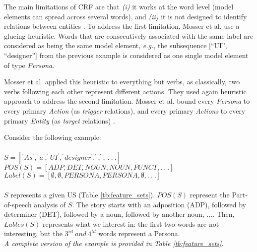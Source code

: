 The main limitations of CRF are that \emph{(i)} it works at the word level (model elements can spread across several words), and \emph{(ii)} it is not designed to identify relations between entities \cite{arulmohan2023extracting}.
    To address the first limitation, Mosser et al. use a glueing heuristic. Words that are consecutively associated with the same label are considered as being the same model element, \emph{e.g.}, the subsequence [\enquote{UI}, \enquote{designer}] from the previous example is considered as one single model element of type \emph{Persona}.
    
Mosser et al. applied this heuristic to everything but verbs, as classically, two verbs following each other represent different actions. They used again heuristic approach to address the second limitation. Mosser et al. bound every \emph{Persona} to every primary \emph{Action} (as\emph{ trigger} relations), and every primary \emph{Actions} to every primary \emph{Entity} (as \emph{target} relations) \cite{arulmohan2023extracting}.
\begin{example} Consider the following example:\\ \\
$S=[^\prime As^\prime,^\prime a^\prime,^\prime UI^\prime,^\prime designer^\prime,^\prime,^\prime,\ .\ .\ .]$ \\
$POS(S)=[ADP,DET,NOUN,NOUN,PUNCT,.\ .\ .]$ \\
$Label \left (S \right ) = \left [ \emptyset ,\emptyset ,PERSONA,PERSONA,\emptyset ,.\ .\ .\right ]$ \\\\
$S$ represents a given US (Table \ref{tb:feature_sets}). $POS \left (S \right )$ represent the Part-of-speech analysis of $S$. The story starts with an adposition (ADP), followed by determiner (DET), followed by a noun, followed by another noun, .... Then, $Lables\left (S \right )$ represents what we interest in: the first two words are not interesting, but the $3^{rd}\  and \ 4^{td}$ words represent a Persona.\\ 
\emph{A complete version of the example is provided in Table \ref{tb:feature_sets}.}
\end{example}
